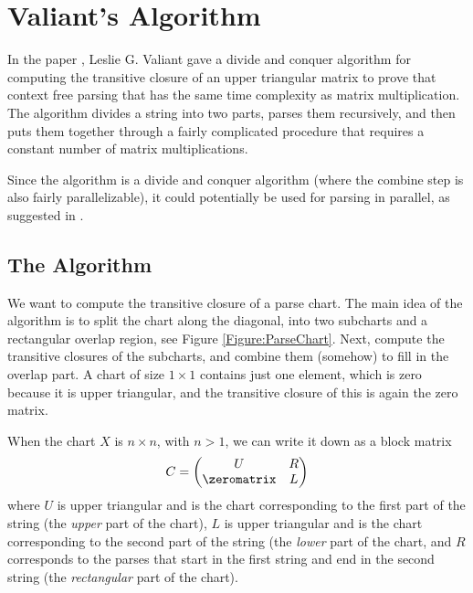 \section{Valiant's Algorithm}
In the paper \cite{Valiant}, Leslie G. Valiant gave a divide and conquer algorithm for computing the transitive closure of an upper triangular matrix to prove that context free parsing that has the same time complexity as matrix multiplication. The algorithm divides a string into two parts, parses them recursively, and then puts them together through a fairly complicated procedure that requires a constant number of matrix multiplications.

Since the algorithm is a divide and conquer algorithm (where the combine step is also fairly parallelizable), it could potentially be used for parsing in parallel, as suggested in \cite{JP-PP}.

\subsection{The Algorithm} 
We want to compute the transitive closure of a parse chart. The main idea of the algorithm is to split the chart along the diagonal, into two subcharts and a rectangular overlap region, see Figure \ref{Figure:ParseChart}. Next, compute the transitive closures of the subcharts, and combine them (somehow) to fill in the overlap part. A chart of size $1 \times 1$ contains just one element, which is zero because it is upper triangular, and the transitive closure of this is again the zero matrix.

\label{Section:Subdivision-in-Specification}
When the chart $X$ is $n \times n$, with $n > 1$, we can write it down as a block matrix 
\begin{equation*}
  C = 
  \begin{pmatrix}
    U & R \\
    \zeromatrix & L
  \end{pmatrix}
\end{equation*}
where $U$ is upper triangular and is the chart corresponding to the first part of the string (the \emph{upper} part of the chart), $L$ is upper triangular and is the chart corresponding to the second part of the string (the \emph{lower} part of the chart, and $R$ corresponds to the parses that start in the first string and end in the second string (the \emph{rectangular} part of the chart).

